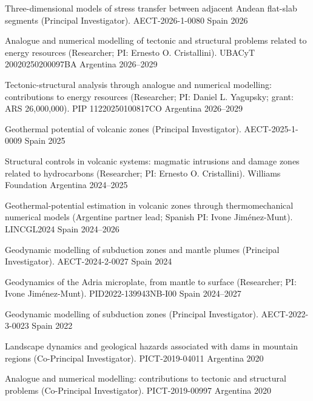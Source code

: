 
\begingroup
\renewcommand{\arraystretch}{1.10}
\renewcommand*{\honorpositionstyle}[1]{{\fontsize{9pt}{10.8pt}\bodyfont\mdseries\color{darktext} #1}}
\begin{cvhonors}

\cvhonor
    {Three-dimensional models of stress transfer between adjacent Andean flat-slab segments (Principal Investigator).}
    {AECT-2026-1-0080}
    {Spain}
    {2026}

\cvhonor
    {Analogue and numerical modelling of tectonic and structural problems related to energy resources (Researcher; PI: Ernesto O. Cristallini).}
    {UBACyT 20020250200097BA}
    {Argentina}
    {2026--2029}

\cvhonor
    {Tectonic-structural analysis through analogue and numerical modelling: contributions to energy resources (Researcher; PI: Daniel L. Yagupsky; grant: ARS 26,000,000).}
    {PIP 11220250100817CO}
    {Argentina}
    {2026--2029}

\cvhonor
    {Geothermal potential of volcanic zones (Principal Investigator).}
    {AECT-2025-1-0009}
    {Spain}
    {2025}

\cvhonor
    {Structural controls in volcanic systems: magmatic intrusions and damage zones related to hydrocarbons (Researcher; PI: Ernesto O. Cristallini).}
    {Williams Foundation}
    {Argentina}
    {2024--2025}

\cvhonor
    {Geothermal-potential estimation in volcanic zones through thermomechanical numerical models (Argentine partner lead; Spanish PI: Ivone Jiménez-Munt).}
    {LINCGL2024}
    {Spain}
    {2024--2026}

\cvhonor
    {Geodynamic modelling of subduction zones and mantle plumes (Principal Investigator).}
    {AECT-2024-2-0027}
    {Spain}
    {2024}

\cvhonor
    {Geodynamics of the Adria microplate, from mantle to surface (Researcher; PI: Ivone Jiménez-Munt).}
    {PID2022-139943NB-I00}
    {Spain}
    {2024--2027}

\cvhonor
    {Geodynamic modelling of subduction zones (Principal Investigator).}
    {AECT-2022-3-0023}
    {Spain}
    {2022}

\cvhonor
    {Landscape dynamics and geological hazards associated with dams in mountain regions (Co-Principal Investigator).}
    {PICT-2019-04011}
    {Argentina}
    {2020}

\cvhonor
    {Analogue and numerical modelling: contributions to tectonic and structural problems (Co-Principal Investigator).}
    {PICT-2019-00997}
    {Argentina}
    {2020}


\end{cvhonors}
